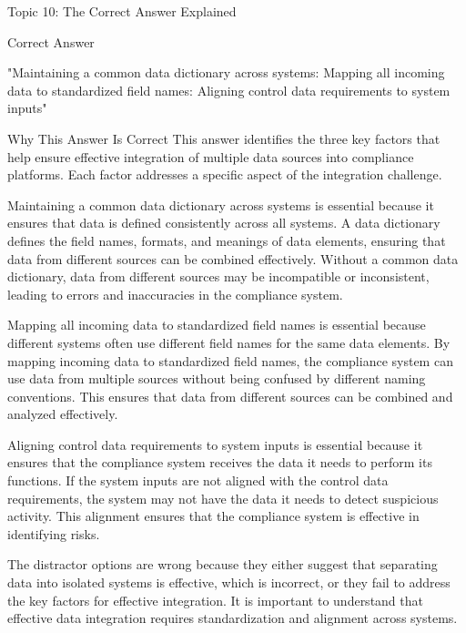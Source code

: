 \documentclass[8pt]{beamer}  %
\newcommand{\correct}{\textcolor{correctgreen}{\ding{51}}}
\begin{document}
	\begin{frame}{Topic 10: The Correct Answer Explained}
		\begin{block}{\large \correct \textcolor{correctgreen}{Correct Answer}}
			\begin{center}
				\Large "Maintaining a common data dictionary across systems: Mapping all incoming data to standardized field names: Aligning control data requirements to system inputs"
			\end{center}
		\end{block}
		
		\vspace{0.2cm}
		\begin{block}{\large Why This Answer Is Correct}
			This answer identifies the three key factors that help ensure effective integration of multiple data sources into compliance platforms. Each factor addresses a specific aspect of the integration challenge.
			
			Maintaining a common data dictionary across systems is essential because it ensures that data is defined consistently across all systems. A data dictionary defines the field names, formats, and meanings of data elements, ensuring that data from different sources can be combined effectively. Without a common data dictionary, data from different sources may be incompatible or inconsistent, leading to errors and inaccuracies in the compliance system.
			
			Mapping all incoming data to standardized field names is essential because different systems often use different field names for the same data elements. By mapping incoming data to standardized field names, the compliance system can use data from multiple sources without being confused by different naming conventions. This ensures that data from different sources can be combined and analyzed effectively.
			
			Aligning control data requirements to system inputs is essential because it ensures that the compliance system receives the data it needs to perform its functions. If the system inputs are not aligned with the control data requirements, the system may not have the data it needs to detect suspicious activity. This alignment ensures that the compliance system is effective in identifying risks.
			
			The distractor options are wrong because they either suggest that separating data into isolated systems is effective, which is incorrect, or they fail to address the key factors for effective integration. It is important to understand that effective data integration requires standardization and alignment across systems.
		\end{block}
		

\end{frame}
\end{document}
